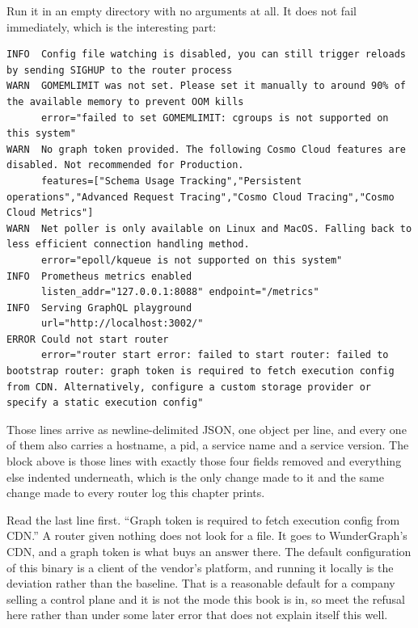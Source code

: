 %
Run it in an empty directory with no arguments at all. It does not fail
immediately, which is the interesting part:

\begin{verbatim}
INFO  Config file watching is disabled, you can still trigger reloads by sending SIGHUP to the router process
WARN  GOMEMLIMIT was not set. Please set it manually to around 90% of the available memory to prevent OOM kills
      error="failed to set GOMEMLIMIT: cgroups is not supported on this system"
WARN  No graph token provided. The following Cosmo Cloud features are disabled. Not recommended for Production.
      features=["Schema Usage Tracking","Persistent operations","Advanced Request Tracing","Cosmo Cloud Tracing","Cosmo Cloud Metrics"]
WARN  Net poller is only available on Linux and MacOS. Falling back to less efficient connection handling method.
      error="epoll/kqueue is not supported on this system"
INFO  Prometheus metrics enabled
      listen_addr="127.0.0.1:8088" endpoint="/metrics"
INFO  Serving GraphQL playground
      url="http://localhost:3002/"
ERROR Could not start router
      error="router start error: failed to start router: failed to bootstrap router: graph token is required to fetch execution config from CDN. Alternatively, configure a custom storage provider or specify a static execution config"
\end{verbatim}

%
Those lines arrive as newline-delimited JSON, one object per line, and every
one of them also carries a hostname, a pid, a service name and a service
version. The block above is those lines with exactly those four fields removed
and everything else indented underneath, which is the only change made to it
and the same change made to every router log this chapter prints.

%
Read the last line first. \enquote{Graph token is required to fetch execution
config from CDN.} A router given nothing does not look for a file. It goes to
WunderGraph's CDN, and a graph token is what buys an answer there. The default
configuration of this binary is a client of the vendor's platform, and running
it locally is the deviation rather than the baseline. That is a reasonable
default for a company selling a control plane and it is not the mode this book
is in, so meet the refusal here rather than under some later error that does
not explain itself this well.

